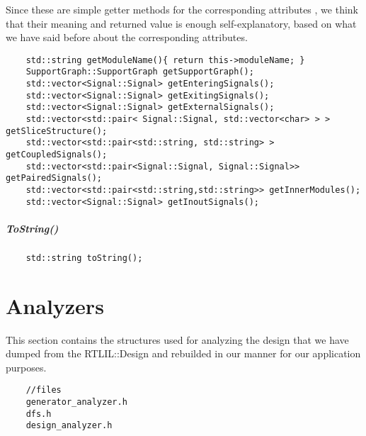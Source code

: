 \documentclass{article}
\newcommand{\sectionbreak}{\clearpage}
\begin{document}
Since these are simple getter methods for the corresponding attributes , we think that their meaning and returned value is enough self-explanatory, based on what we have said before about the corresponding attributes.\\

\begin{mdframed}[hidealllines=true, backgroundcolor=magenta!10]
	\begin{lstlisting}
	std::string getModuleName(){ return this->moduleName; }
	SupportGraph::SupportGraph getSupportGraph();
	std::vector<Signal::Signal> getEnteringSignals();
	std::vector<Signal::Signal> getExitingSignals();
	std::vector<Signal::Signal> getExternalSignals();
	std::vector<std::pair< Signal::Signal, std::vector<char> > > getSliceStructure();
	std::vector<std::pair<std::string, std::string> > getCoupledSignals();
	std::vector<std::pair<Signal::Signal, Signal::Signal>> getPairedSignals();
	std::vector<std::pair<std::string,std::string>> getInnerModules();
	std::vector<Signal::Signal> getInoutSignals();
	\end{lstlisting}
\end{mdframed}

\subsubsection{ToString()}

\begin{mdframed}[hidealllines=true, backgroundcolor=magenta!10]
	\begin{lstlisting}
	std::string toString();
	\end{lstlisting}
\end{mdframed}

\sectionbreak{\clearpage}


\part{Analyzers}

This section contains the structures used for analyzing the design that we have dumped from the RTLIL::Design and rebuilded in our manner for our application purposes.\\

\begin{mdframed}[hidealllines=true, backgroundcolor=cyan!10]
	\begin{lstlisting}
	//files
	generator_analyzer.h
	dfs.h
	design_analyzer.h
	\end{lstlisting}
\end{mdframed}
\end{document}
